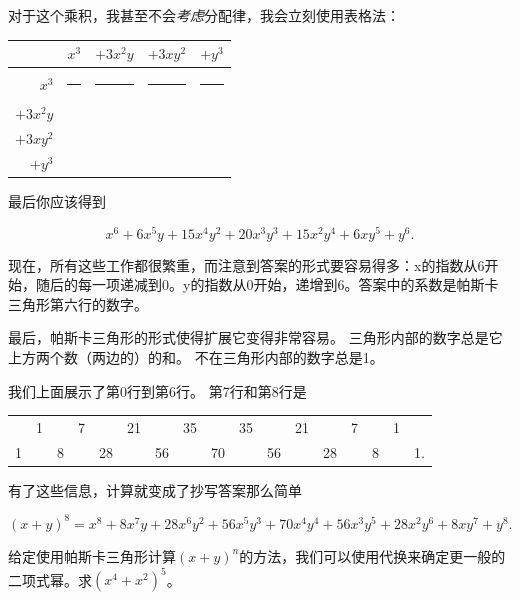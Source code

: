 对于这个乘积，我甚至不会\emph{考虑}分配律，我会立刻使用表格法：

\begin{center}
\begin{tabular}{r|cccc}
\rule[-6pt]{0pt}{24pt} & $x^3$ & $+ 3x^2y$ & $+ 3xy^2$ & $+ y^3$ \\ \hline
\rule[-6pt]{0pt}{24pt} $x^3$ & \rule{45pt}{0pt} & \rule{45pt}{0pt} & \rule{45pt}{0pt} & \rule{45pt}{0pt} \\
\rule[-6pt]{0pt}{24pt} $+ 3x^2y$ &       &           &           &         \\
\rule[-6pt]{0pt}{24pt} $+ 3xy^2$ &       &           &           &         \\
\rule[-6pt]{0pt}{24pt} $+ y^3$   &       &           &           &         \\

\end{tabular} 
\end{center}

最后你应该得到

\[ x^6 + 6 x^5y + 15 x^4y^2 + 20 x^3y^3 + 15 x^2y^4 + 6 xy^5 + y^6. \]

现在，所有这些工作都很繁重，而注意到答案的形式要容易得多：x的指数从6开始，随后的每一项递减到0。y的指数从0开始，递增到6。答案中的系数是帕斯卡三角形第六行的数字。

最后，帕斯卡三角形的形式使得扩展它变得非常容易。
三角形内部的数字总是它上方两个数（两边的）的和。
不在三角形内部的数字总是1。

我们上面展示了第0行到第6行。
第7行和第8行是

\begin{center}
\begin{tabular}{ccccccccccccccccc}
   & 1 &   & 7 &    & 21 &    & 35 &    & 35 &    & 21 &    & 7 &   & 1 & \\
 1 &   & 8 &   & 28 &    & 56 &    & 70 &    & 56 &    & 28 &   & 8 &   & 1. \\ \end{tabular}
\end{center}

有了这些信息，计算就变成了抄写答案那么简单

\[ (x+y)^8 =  x^8 + 8x^7y + 28x^6y^2 + 56x^5y^3 + 70x^4y^4 + 56x^3y^5 + 28x^2y^6 + 8xy^7 + y^8. \]

\begin{exer}
给定使用帕斯卡三角形计算$(x+y)^n$的方法，我们可以使用代换来确定更一般的二项式幂。求$(x^4 + x^2)^5$。
\end{exer}


